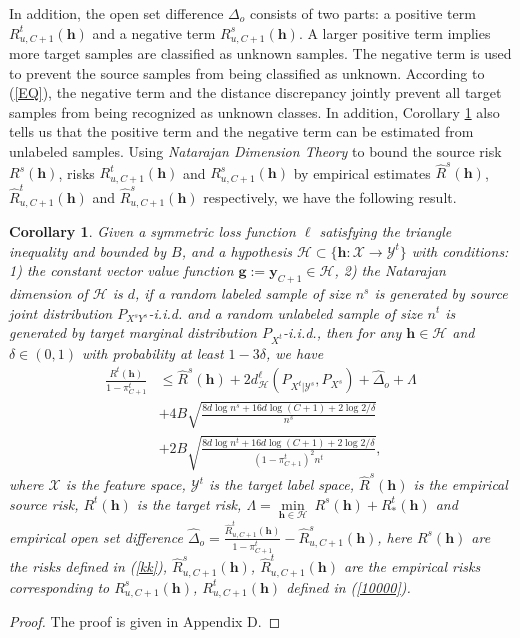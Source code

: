 \documentclass[journal]{IEEEtran}
\newtheorem{corollary}{Corollary}[theorem]
\begin{document}
In addition, the open set difference $\Delta_o$ consists of two parts: a positive term $R^t_{u,C+1}({\bm h})$ and a negative term $R^s_{u,C+1}({\bm h})$. A larger positive term implies more target samples are classified as unknown samples. The negative term is used to prevent the source samples from being classified as unknown. According to (\ref{EQ}),
  the negative term and the distance discrepancy jointly prevent all target samples from being recognized as unknown classes.  In addition, {Corollary \ref{0.1}} also tells us that the positive term and the negative term can be estimated from unlabeled samples. Using \textit{Natarajan Dimension Theory} \cite{DBLP:books/mk/Natarajan91} to bound the source risk $R^s({\bm h})$, risks $R^t_{u,C+1}({\bm h})$ and $R^s_{u,C+1}({\bm h})$ by empirical estimates $\widehat{R}^s({\bm h})$, $\widehat{R}^{t}_{u,C+1}({\bm h})$ and $\widehat{R}^s_{u,C+1}({\bm h})$ respectively, we have the following result.
\begin{corollary}\label{0.1}
Given a symmetric loss function $\ell$ satisfying the triangle inequality and bounded by $B$, and a hypothesis $\mathcal{H}\subset \{{\bm h}:\mathcal{X}\rightarrow \mathcal{Y}^t\} $  with conditions: 1) the constant vector value function ${\bm g}:={\mathbf{y}}_{C+1}\in \mathcal{H}$, 2) the Natarajan dimension of $\mathcal{H}$ is $d$, if a random labeled sample of size $n^s$ is generated by  source joint distribution ${P}_{X^sY^s}$-i.i.d. and a random unlabeled sample of size $n^t$ is generated by target marginal distribution $P_{X^t}$-i.i.d., then for any ${\bm h}\in \mathcal{H}$ and $\delta\in (0,1)$ with probability at least $1-3\delta$, we have
\begin{equation*}
\begin{split}
 \frac{R^t({\bm h})}{1-\pi_{C+1}^t}&\leq   {\widehat{R}^s({\bm h})}
 +{{2d_{\mathcal{H}}^{\ell}(P_{X^t|\mathcal{Y}^s},P_{X^s})}}+\widehat{\Delta}_o+\Lambda\\&+4B\sqrt{\frac{8d\log n^s+16d \log(C+1)+2\log{2/\delta}}{n^s}}\\&+2B\sqrt{\frac{8d\log n^t+16d \log(C+1)+2\log{2/\delta}}{{(1-\pi_{C+1}^t)}^2{n^t}}},
 \end{split}
\end{equation*}
where $\mathcal{X}$ is the feature space, $\mathcal{Y}^t$ is the target label space, ${\widehat{R}^s({\bm h})}$ is the empirical source risk, ${{R}^t({\bm h})}$ is the target risk, $\Lambda=\underset{{\bm h}\in \mathcal{H}}{\min}  ~R^s({\bm h})+R_*^t({\bm h})$ and empirical open set difference  $\widehat{\Delta}_o=\frac{\widehat{R}^t_{u,C+1}({\bm h})}{1-\pi_{C+1}^t}
 -\widehat{R}^s_{u,C+1}({\bm h})$, here $R^s({\bm h})$ are the risks defined in (\ref{kk}), $\widehat{R}^s_{u,C+1}({\bm h})$, $\widehat{R}^t_{u,C+1}({\bm h})$ are the empirical risks corresponding to ${R}^s_{u,C+1}({\bm h})$, ${R}^t_{u,C+1}({\bm h})$ defined in (\ref{10000}).
\end{corollary}
\begin{proof}
The proof is given in Appendix D.
\end{proof}
\end{document}
